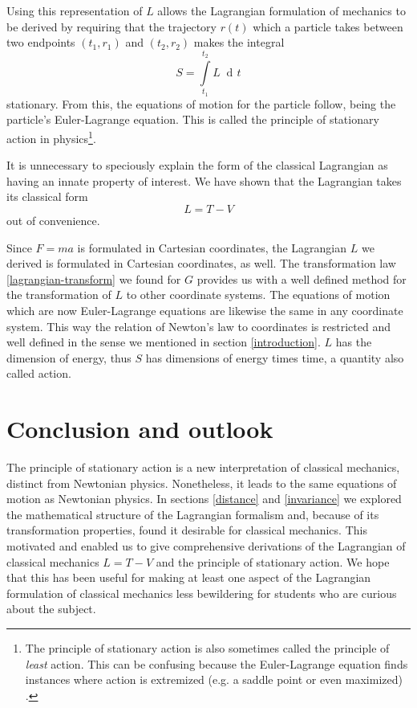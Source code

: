 \documentclass[prb,preprint]{revtex4-1}
\DeclareMathOperator{\dd}{d\!}
\begin{document}
Using this representation of $L$ allows the Lagrangian formulation of mechanics to be derived by requiring that the trajectory $r(t)$ which a particle takes between two endpoints $(t_1,r_1)$ and $(t_2,r_2)$ makes the integral
\begin{equation}\label{eqref:action}
S=\int\limits_{t_1}^{t_2} L \; \dd t
\end{equation}
stationary. From this, the equations of motion for the particle follow, being the particle's Euler-Lagrange equation. This is called the principle of stationary action in physics\footnote{The principle of stationary action is also sometimes called the principle of \emph{least} action. This can be confusing because the Euler-Lagrange equation finds instances where action is extremized (e.g. a saddle point or even maximized)  \cite{gray2007action}.}.

It is unnecessary to speciously explain the form of the classical Lagrangian as having an innate property of interest. We have shown that the Lagrangian takes its classical form
\begin{equation}
  L = T-V
\end{equation}
out of convenience.

Since $F=ma$ is formulated in Cartesian coordinates, the Lagrangian $L$ we derived is formulated in Cartesian coordinates, as well. The transformation law \ref{lagrangian-transform} we found for $G$ provides us with a well defined method for the transformation of $L$ to other coordinate systems. The equations of motion which are now Euler-Lagrange equations are likewise the same in any coordinate system.  This way the relation of Newton's law to coordinates is restricted and well defined in the sense we mentioned in section \ref{introduction}. $L$ has the dimension of energy, thus $S$ has dimensions of energy times time, a quantity also called action.

\section{Conclusion and outlook}

The principle of stationary action is a new interpretation of classical mechanics, distinct from Newtonian physics. Nonetheless, it leads to the same equations of motion as Newtonian physics. In sections \ref{distance} and \ref{invariance} we explored the mathematical structure of the Lagrangian formalism and, because of its transformation properties, found it desirable for classical mechanics. This motivated and enabled us to give comprehensive derivations of the Lagrangian of classical mechanics $L=T-V$ and the principle of stationary action. We hope that this has been useful for making at least one aspect of the Lagrangian formulation of classical mechanics less bewildering for students who are curious about the subject.
\end{document}
